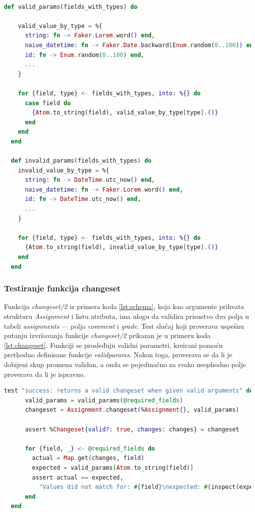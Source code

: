 \documentclass[12pt,oneside]{memoir}
\begin{document}
\begin{lstlisting}[language=elixir, caption={Definicije pomoćnih funkcija \emph{valid{\textunderscore}params} i \emph{invalid{\textunderscore}params}},captionpos=b, label={lst:faker}]

def valid_params(fields_with_types) do

    valid_value_by_type = %{
      string: fn -> Faker.Lorem.word() end,
      naive_datetime: fn -> Faker.Date.backward(Enum.random(0..100)) end,
      id: fn -> Enum.random(0..100) end,
      ... 
    }

    for {field, type} <- fields_with_types, into: %{} do
      case field do
        {Atom.to_string(field), valid_value_by_type[type].()}
      end
    end
  end

  def invalid_params(fields_with_types) do
    invalid_value_by_type = %{
      string: fn -> DateTime.utc_now() end,
      naive_datetime: fn -> Faker.Lorem.word() end,
      id: fn -> DateTime.utc_now() end,
      ...
    }

    for {field, type} <- fields_with_types, into: %{} do
      {Atom.to_string(field), invalid_value_by_type[type].()}
    end
  end

\end{lstlisting}

\subsubsection{Testiranje funkcija changeset}

\par Funkcija \emph{changeset/2} iz primera koda \ref{lst:schema}, koja kao argumente prihvata strukturu \emph{Assignment} i listu atributa, ima ulogu da validira prisustvo dva polja u tabeli \emph{assignments} --- polja \emph{comment} i \emph{grade}. Test slučaj koji proverava uspešnu putanju izvršavanja funkcije \emph{changeset/2} prikazan je u primeru koda \ref{lst:changeset}. Funkciji se prosleđuju validni parametri, kreirani pomoću prethodno definisane funkcije \emph{valid{\textunderscore}params}. Nakon toga, proverava se da li je dobijeni skup promena validan, a onda se pojedinačno za svako neophodno polje proverava da li je ispravno.

\begin{lstlisting}[language=elixir, caption={Test slučaj uspešne upotrebe funkcije \emph{changeset/2}},captionpos=b, label={lst:changeset}]
  test "success: returns a valid changeset when given valid arguments" do
      valid_params = valid_params(@required_fields)
      changeset = Assignment.changeset(%Assignment{}, valid_params)

      assert %Changeset{valid?: true, changes: changes} = changeset

      for {field, _} <- @required_fields do
        actual = Map.get(changes, field)
        expected = valid_params[Atom.to_string(field)]
        assert actual == expected,
          "Values did not match for: #{field}\nexpected: #{inspect(expected)}\nactual: #{inspect(actual)}"
      end
  end 
\end{lstlisting}
\end{document}
